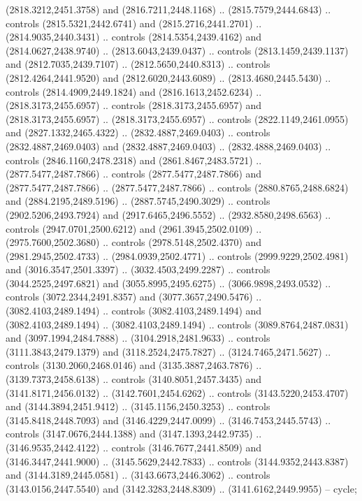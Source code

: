 \begin{scope}[shift={(407.03862,-246.29561)}]
\begin{scope}[shift={(-2346.9339,-1948.928)}]
      (2818.3212,2451.3758) and (2816.7211,2448.1168) .. (2815.7579,2444.6843) ..
      controls (2815.5321,2442.6741) and (2815.2716,2441.2701) ..
      (2814.9035,2440.3431) .. controls (2814.5354,2439.4162) and
      (2814.0627,2438.9740) .. (2813.6043,2439.0437) .. controls
      (2813.1459,2439.1137) and (2812.7035,2439.7107) .. (2812.5650,2440.8313) ..
      controls (2812.4264,2441.9520) and (2812.6020,2443.6089) ..
      (2813.4680,2445.5430) .. controls (2814.4909,2449.1824) and
      (2816.1613,2452.6234) .. (2818.3173,2455.6957) .. controls
      (2818.3173,2455.6957) and (2818.3173,2455.6957) .. (2818.3173,2455.6957) ..
      controls (2822.1149,2461.0955) and (2827.1332,2465.4322) ..
      (2832.4887,2469.0403) .. controls (2832.4887,2469.0403) and
      (2832.4887,2469.0403) .. (2832.4888,2469.0403) .. controls
      (2846.1160,2478.2318) and (2861.8467,2483.5721) .. (2877.5477,2487.7866) ..
      controls (2877.5477,2487.7866) and (2877.5477,2487.7866) ..
      (2877.5477,2487.7866) .. controls (2880.8765,2488.6824) and
      (2884.2195,2489.5196) .. (2887.5745,2490.3029) .. controls
      (2902.5206,2493.7924) and (2917.6465,2496.5552) .. (2932.8580,2498.6563) ..
      controls (2947.0701,2500.6212) and (2961.3945,2502.0109) ..
      (2975.7600,2502.3680) .. controls (2978.5148,2502.4370) and
      (2981.2945,2502.4733) .. (2984.0939,2502.4771) .. controls
      (2999.9229,2502.4981) and (3016.3547,2501.3397) .. (3032.4503,2499.2287) ..
      controls (3044.2525,2497.6821) and (3055.8995,2495.6275) ..
      (3066.9898,2493.0532) .. controls (3072.2344,2491.8357) and
      (3077.3657,2490.5476) .. (3082.4103,2489.1494) .. controls
      (3082.4103,2489.1494) and (3082.4103,2489.1494) .. (3082.4103,2489.1494) ..
      controls (3089.8764,2487.0831) and (3097.1994,2484.7888) ..
      (3104.2918,2481.9633) .. controls (3111.3843,2479.1379) and
      (3118.2524,2475.7827) .. (3124.7465,2471.5627) .. controls
      (3130.2060,2468.0146) and (3135.3887,2463.7876) .. (3139.7373,2458.6138) ..
      controls (3140.8051,2457.3435) and (3141.8171,2456.0132) ..
      (3142.7601,2454.6262) .. controls (3143.5220,2453.4707) and
      (3144.3894,2451.9412) .. (3145.1156,2450.3253) .. controls
      (3145.8418,2448.7093) and (3146.4229,2447.0099) .. (3146.7453,2445.5743) ..
      controls (3147.0676,2444.1388) and (3147.1393,2442.9735) ..
      (3146.9535,2442.4122) .. controls (3146.7677,2441.8509) and
      (3146.3447,2441.9000) .. (3145.5629,2442.7833) .. controls
      (3144.9352,2443.8387) and (3144.3189,2445.0581) .. (3143.6673,2446.3062) ..
      controls (3143.0156,2447.5540) and (3142.3283,2448.8309) ..
      (3141.6162,2449.9955) -- cycle;


\end{scope}
\end{scope}
